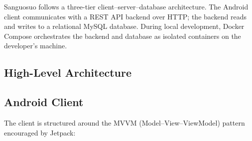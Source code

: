 Sanguosuo follows a three-tier client--server--database architecture. The Android client communicates with a REST API backend over HTTP; the backend reads and writes to a relational MySQL database. During local development, Docker Compose orchestrates the backend and database as isolated containers on the developer's machine.

\subsection{High-Level Architecture}

\begin{center}
\end{center}

\subsection{Android Client}

The client is structured around the MVVM (Model--View--ViewModel) pattern encouraged by Jetpack:

